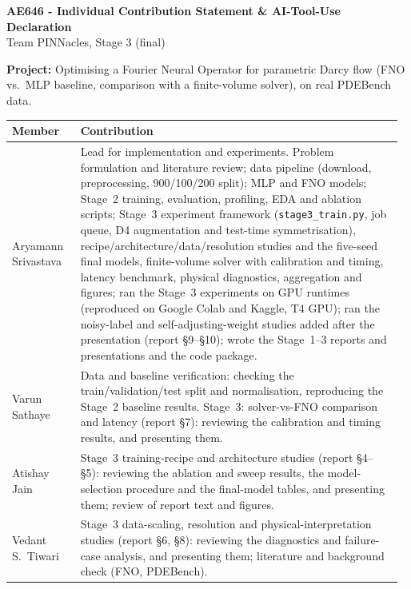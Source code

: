 \documentclass[10.5pt,a4paper]{article}
\begin{document}
\begin{center}\textbf{\Large AE646 - Individual Contribution Statement \& AI-Tool-Use Declaration}\\[2pt]
Team PINNacles, Stage 3 (final)\end{center}

\noindent\textbf{Project:} Optimising a Fourier Neural Operator for parametric Darcy flow (FNO vs.\ MLP baseline, comparison with a finite-volume solver), on real PDEBench data.

\vspace{4pt}
\renewcommand{\arraystretch}{1.25}
\begin{tabular}{@{}>{\raggedright\arraybackslash}p{0.17\linewidth}p{0.80\linewidth}@{}}
\toprule
\textbf{Member} & \textbf{Contribution}\\\midrule
Aryamann Srivastava & Lead for implementation and experiments. Problem formulation and literature review; data pipeline (download, preprocessing, 900/100/200 split); MLP and FNO models; Stage~2 training, evaluation, profiling, EDA and ablation scripts; Stage~3 experiment framework (\texttt{stage3\_train.py}, job queue, D4 augmentation and test-time symmetrisation), recipe/architecture/data/resolution studies and the five-seed final models, finite-volume solver with calibration and timing, latency benchmark, physical diagnostics, aggregation and figures; ran the Stage~3 experiments on GPU runtimes (reproduced on Google Colab and Kaggle, T4 GPU); ran the noisy-label and self-adjusting-weight studies added after the presentation (report \S9--\S10); wrote the Stage~1--3 reports and presentations and the code package.\\
Varun Sathaye & Data and baseline verification: checking the train/validation/test split and normalisation, reproducing the Stage~2 baseline results. Stage~3: solver-vs-FNO comparison and latency (report \S7): reviewing the calibration and timing results, and presenting them.\\
Atishay Jain & Stage~3 training-recipe and architecture studies (report \S4--\S5): reviewing the ablation and sweep results, the model-selection procedure and the final-model tables, and presenting them; review of report text and figures.\\
Vedant S.\ Tiwari & Stage~3 data-scaling, resolution and physical-interpretation studies (report \S6, \S8): reviewing the diagnostics and failure-case analysis, and presenting them; literature and background check (FNO, PDEBench).\\
\bottomrule
\end{tabular}
\end{document}
